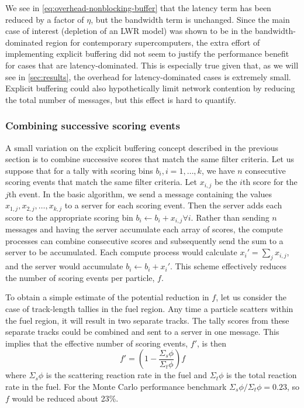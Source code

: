 \noindent We see in \eqref{eq:overhead-nonblocking-buffer} that the latency term
has been reduced by a factor of $\eta$, but the bandwidth term is
unchanged. Since the main case of interest (depletion of an LWR model) was shown
to be in the bandwidth-dominated region for contemporary supercomputers, the
extra effort of implementing explicit buffering did not seem to justify the
performance benefit for cases that are latency-dominated. This is especially
true given that, as we will see in \autoref{sec:results}, the overhead for
latency-dominated cases is extremely small. Explicit buffering could also
hypothetically limit network contention by reducing the total number of
messages, but this effect is hard to quantify.

\subsubsection{Combining successive scoring events}

A small variation on the explicit buffering concept described in the previous
section is to combine successive scores that match the same filter criteria. Let
us suppose that for a tally with scoring bins $b_i, i = 1, \dots, k$, we have
$n$ consecutive scoring events that match the same filter criteria. Let
$x_{i,j}$ be the $i$th score for the $j$th event. In the basic algorithm, we
send a message containing the values $x_{1,j}, x_{2,j}, \dots, x_{k,j}$ to a
server for each scoring event. Then the server adds each score to the
appropriate scoring bin $b_i \gets b_i + x_{i,j} \forall i$. Rather than sending
$n$ messages and having the server accumulate each array of scores, the compute
processes can combine consecutive scores and subsequently send the sum to a
server to be accumulated. Each compute process would calculate $x_i' = \sum_j
x_{i,j}$, and the server would accumulate $b_i \gets b_i + x_i'$. This scheme
effectively reduces the number of scoring events per particle, $f$.

To obtain a simple estimate of the potential reduction in $f$, let us consider
the case of track-length tallies in the fuel region. Any time a particle
scatters within the fuel region, it will result in two separate tracks. The
tally scores from these separate tracks could be combined and sent to a server
in one message. This implies that the effective number of scoring events, $f'$,
is then
\begin{equation}
  f' = \left ( 1 - \frac{\Sigma_s \phi}{\Sigma_t \phi} \right ) f
\end{equation}
where $\Sigma_s \phi$ is the scattering reaction rate in the fuel and $\Sigma_t
\phi$ is the total reaction rate in the fuel. For the Monte Carlo performance
benchmark $\Sigma_s \phi/\Sigma_t \phi = 0.23$, so $f$ would be reduced about
23\%.

